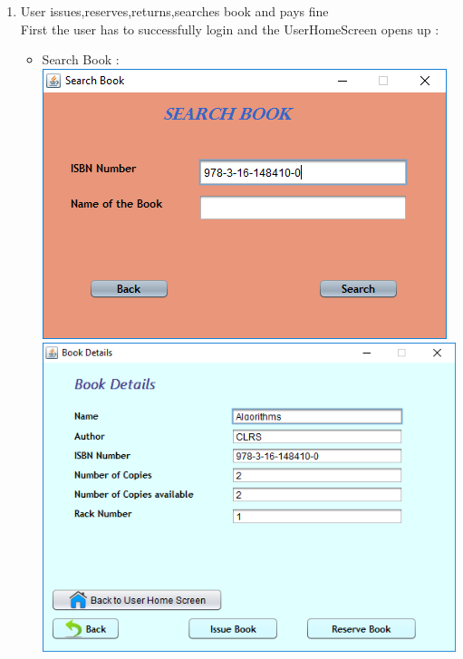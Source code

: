 \documentclass{article}
\begin{document}
\begin{enumerate}
\item User issues,reserves,returns,searches book and pays fine \\
First the user has to successfully login and the UserHomeScreen opens up :\\
\begin{itemize}
\item Search Book :\\
\includegraphics[scale=0.8]{images/UserLogin/Actions/SearchExisting/SearchByISBN/SearchExistingBook.PNG}\\
\includegraphics[scale=0.8]{images/UserLogin/Actions/SearchExisting/SearchByISBN/SearchExistingBookFound.PNG}\\


\end{itemize}
\end{enumerate}
\end{document}
